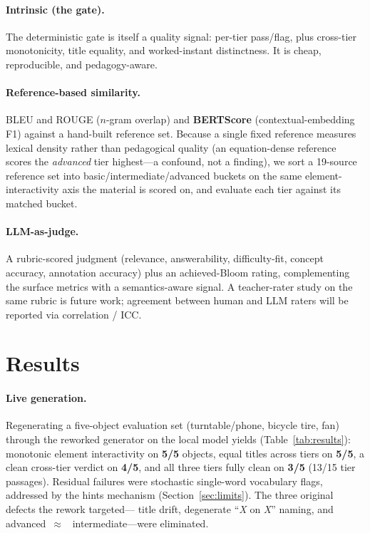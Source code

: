\documentclass[11pt]{article}
\begin{document}
\paragraph{Intrinsic (the gate).} The deterministic gate is itself a quality
signal: per-tier pass/flag, plus cross-tier monotonicity, title equality, and
worked-instant distinctness. It is cheap, reproducible, and pedagogy-aware.

\paragraph{Reference-based similarity.} BLEU and ROUGE ($n$-gram overlap) and
\textbf{BERTScore} (contextual-embedding F1) against a hand-built reference
set. Because a single fixed reference measures lexical density rather than
pedagogical quality (an equation-dense reference scores the \emph{advanced}
tier highest---a confound, not a finding), we sort a 19-source reference set
into basic/intermediate/advanced buckets on the same element-interactivity axis
the material is scored on, and evaluate each tier against its matched bucket.

\paragraph{LLM-as-judge.} A rubric-scored judgment (relevance, answerability,
difficulty-fit, concept accuracy, annotation accuracy) plus an achieved-Bloom
rating, complementing the surface metrics with a semantics-aware signal. A
teacher-rater study on the same rubric is future work; agreement between
human and LLM raters will be reported via correlation / ICC.

\section{Results}
\paragraph{Live generation.} Regenerating a five-object evaluation set
(turntable/phone, bicycle tire, fan) through the reworked generator on the
local model yields (Table~\ref{tab:results}): monotonic element interactivity
on \textbf{5/5} objects, equal titles across tiers on \textbf{5/5}, a clean
cross-tier verdict on \textbf{4/5}, and all three tiers fully clean on
\textbf{3/5} (13/15 tier passages). Residual failures were stochastic
single-word vocabulary flags, addressed by the hints mechanism
(Section~\ref{sec:limits}). The three original defects the rework targeted---%
title drift, degenerate ``\emph{X} on \emph{X}'' naming, and advanced~$\approx$~%
intermediate---were eliminated.
\end{document}
